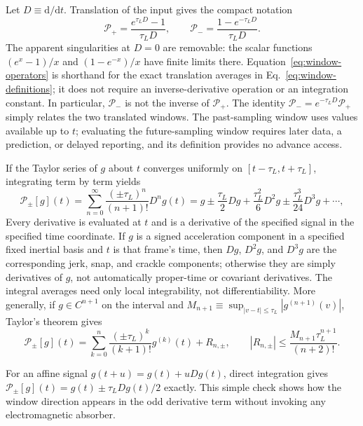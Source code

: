 \documentclass[12pt]{article}
\begin{document}
Let $D\equiv\mathrm{d}/\mathrm{d}t$. Translation of the input gives the compact notation
\begin{equation}
  \mathcal{P}_{+}
  =\frac{e^{\tau_LD}-1}{\tau_LD},
  \qquad
  \mathcal{P}_{-}
  =\frac{1-e^{-\tau_LD}}{\tau_LD}.
  \label{eq:window-operators}
\end{equation}
The apparent singularities at $D=0$ are removable: the scalar functions $(e^x-1)/x$ and $(1-e^{-x})/x$ have finite limits there. Equation~\eqref{eq:window-operators} is shorthand for the exact translation averages in Eq.~\eqref{eq:window-definitions}; it does not require an inverse-derivative operation or an integration constant. In particular, $\mathcal{P}_{-}$ is not the inverse of $\mathcal{P}_{+}$. The identity $\mathcal{P}_{-}=e^{-\tau_LD}\mathcal{P}_{+}$ simply relates the two translated windows. The past-sampling window uses values available up to $t$; evaluating the future-sampling window requires later data, a prediction, or delayed reporting, and its definition provides no advance access.

If the Taylor series of $g$ about $t$ converges uniformly on $[t-\tau_L,t+\tau_L]$, integrating term by term yields
\begin{equation}
  \mathcal{P}_{\pm}[g](t)
  =\sum_{n=0}^{\infty}
  \frac{(\pm \tau_L)^n}{(n+1)!}D^ng(t)
  =g\pm\frac{\tau_L}{2}Dg
  +\frac{\tau_L^2}{6}D^2g
  \pm\frac{\tau_L^3}{24}D^3g+\cdots,
  \label{eq:window-series}
\end{equation}
Every derivative is evaluated at $t$ and is a derivative of the specified signal in the specified time coordinate. If $g$ is a signed acceleration component in a specified fixed inertial basis and $t$ is that frame's time, then $Dg$, $D^2g$, and $D^3g$ are the corresponding jerk, snap, and crackle components; otherwise they are simply derivatives of $g$, not automatically proper-time or covariant derivatives. The integral averages need only local integrability, not differentiability. More generally, if $g\in C^{n+1}$ on the interval and $M_{n+1}\equiv\sup_{|v-t|\le \tau_L}|g^{(n+1)}(v)|$, Taylor's theorem gives
\begin{equation}
  \mathcal{P}_{\pm}[g](t)
  =\sum_{k=0}^{n}\frac{(\pm \tau_L)^k}{(k+1)!}g^{(k)}(t)
  +R_{n,\pm},
  \qquad
  |R_{n,\pm}|\le\frac{M_{n+1}\tau_L^{n+1}}{(n+2)!}.
  \label{eq:window-remainder}
\end{equation}

For an affine signal $g(t+u)=g(t)+uDg(t)$, direct integration gives $\mathcal{P}_{\pm}[g](t)=g(t)\pm \tau_LDg(t)/2$ exactly. This simple check shows how the window direction appears in the odd derivative term without invoking any electromagnetic absorber.
\end{document}
